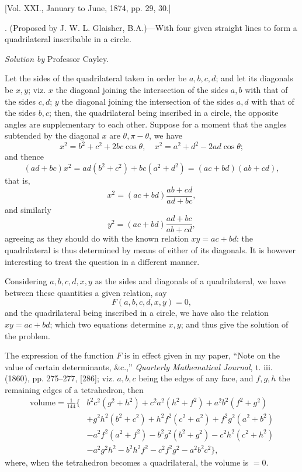 \documentclass[10pt,twoside]{article}
\begin{document}
\bigskip
\begin{center}
[Vol. XXI., January to June, 1874, pp. 29, 30.]
\end{center}

. (Proposed by J. W. L. Glaisher, B.A.)---With four given straight lines to form a quadrilateral inscribable in a circle.

\bigskip
\begin{center}
\textit{Solution by} Professor Cayley.
\end{center}

Let the sides of the quadrilateral taken in order be \(a,b,c,d\); and let its diagonals be \(x,y\); viz. \(x\) the diagonal joining the intersection of the sides \(a,b\) with that of the sides \(c,d\); \(y\) the diagonal joining the intersection of the sides \(a,d\) with that of the sides \(b,c\); then, the quadrilateral being inscribed in a circle, the opposite angles are supplementary to each other. Suppose for a moment that the angles subtended by the diagonal \(x\) are \(\theta,\pi-\theta\), we have
\[
x^2=b^2+c^2+2bc\cos\theta,\quad
x^2=a^2+d^2-2ad\cos\theta;
\]
and thence
\[
(ad+bc)x^2=ad(b^2+c^2)+bc(a^2+d^2)=(ac+bd)(ab+cd),
\]
that is,
\[
x^2=(ac+bd)\frac{ab+cd}{ad+bc},
\]
and similarly
\[
y^2=(ac+bd)\frac{ad+bc}{ab+cd},
\]
agreeing as they should do with the known relation \(xy=ac+bd\): the quadrilateral is thus determined by means of either of its diagonals. It is however interesting to treat the question in a different manner.

Considering \(a,b,c,d,x,y\) as the sides and diagonals of a quadrilateral, we have between these quantities a given relation, say
\[
F(a,b,c,d,x,y)=0,
\]
and the quadrilateral being inscribed in a circle, we have also the relation \(xy=ac+bd\); which two equations determine \(x,y\); and thus give the solution of the problem.
\newpage

The expression of the function \(F\) is in effect given in my paper, ``Note on the value of certain determinants, \&c.,'' \textit{Quarterly Mathematical Journal}, t. iii. (1860), pp. 275--277, [286]; viz. \(a,b,c\) being the edges of any face, and \(f,g,h\) the remaining edges of a tetrahedron, then
\[
\begin{split}
\mathrm{volume}=\frac{1}{144}\{&
b^2c^2(g^2+h^2)+c^2a^2(h^2+f^2)+a^2b^2(f^2+g^2)\\
&+g^2h^2(b^2+c^2)+h^2f^2(c^2+a^2)+f^2g^2(a^2+b^2)\\
&-a^2f^2(a^2+f^2)-b^2g^2(b^2+g^2)-c^2h^2(c^2+h^2)\\
&-a^2g^2h^2-b^2h^2f^2-c^2f^2g^2-a^2b^2c^2\},
\end{split}
\]
where, when the tetrahedron becomes a quadrilateral, the volume is \(=0\).
\end{document}
